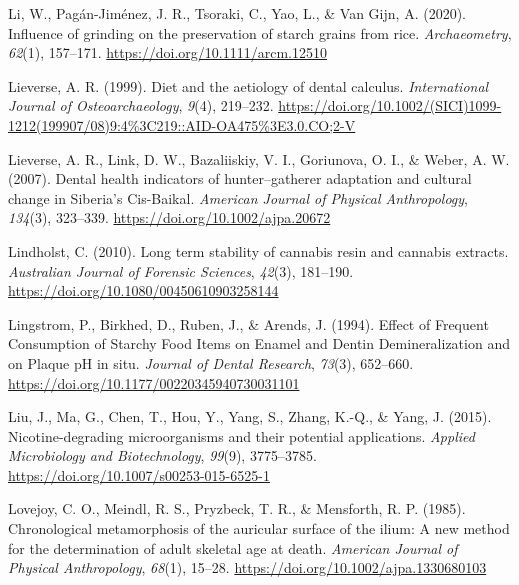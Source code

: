 \documentclass[
  letterpaper,
]{book}
\newlength{\cslhangindent}
\newlength{\cslentryspacingunit} %
\newenvironment{CSLReferences}[2] %
 {%
  \setlength{\parindent}{0pt}
  \ifodd #1
  \let\oldpar\par
  \def\par{\hangindent=\cslhangindent\oldpar}
  \fi
  \setlength{\parskip}{#2\cslentryspacingunit}
 }%
 {}
\begin{document}
\begin{CSLReferences}{1}{0}
\leavevmode{}%
Li, W., Pagán-Jiménez, J. R., Tsoraki, C., Yao, L., \& Van Gijn, A.
(2020). Influence of grinding on the preservation of starch grains from
rice. \emph{Archaeometry}, \emph{62}(1), 157--171.
\url{https://doi.org/10.1111/arcm.12510}

\leavevmode{}%
Lieverse, A. R. (1999). Diet and the aetiology of dental calculus.
\emph{International Journal of Osteoarchaeology}, \emph{9}(4), 219--232.
\url{https://doi.org/10.1002/(SICI)1099-1212(199907/08)9:4\%3C219::AID-OA475\%3E3.0.CO;2-V}

\leavevmode{}%
Lieverse, A. R., Link, D. W., Bazaliiskiy, V. I., Goriunova, O. I., \&
Weber, A. W. (2007). Dental health indicators of hunter--gatherer
adaptation and cultural change in {Siberia}'s {Cis-Baikal}.
\emph{American Journal of Physical Anthropology}, \emph{134}(3),
323--339. \url{https://doi.org/10.1002/ajpa.20672}

\leavevmode{}%
Lindholst, C. (2010). Long term stability of cannabis resin and cannabis
extracts. \emph{Australian Journal of Forensic Sciences}, \emph{42}(3),
181--190. \url{https://doi.org/10.1080/00450610903258144}

\leavevmode{}%
Lingstrom, P., Birkhed, D., Ruben, J., \& Arends, J. (1994). Effect of
{Frequent Consumption} of {Starchy Food Items} on {Enamel} and {Dentin
Demineralization} and on {Plaque pH} in situ. \emph{Journal of Dental
Research}, \emph{73}(3), 652--660.
\url{https://doi.org/10.1177/00220345940730031101}

\leavevmode{}%
Liu, J., Ma, G., Chen, T., Hou, Y., Yang, S., Zhang, K.-Q., \& Yang, J.
(2015). Nicotine-degrading microorganisms and their potential
applications. \emph{Applied Microbiology and Biotechnology},
\emph{99}(9), 3775--3785.
\url{https://doi.org/10.1007/s00253-015-6525-1}

\leavevmode{}%
Lovejoy, C. O., Meindl, R. S., Pryzbeck, T. R., \& Mensforth, R. P.
(1985). Chronological metamorphosis of the auricular surface of the
ilium: {A} new method for the determination of adult skeletal age at
death. \emph{American Journal of Physical Anthropology}, \emph{68}(1),
15--28. \url{https://doi.org/10.1002/ajpa.1330680103}


\end{CSLReferences}
\end{document}
